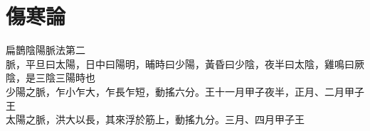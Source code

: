\documentclass[四库全书]{ltc-guji}
\begin{document}
\chapter{傷寒論}
\begin{正文}
\Space[3]扁鵲陰陽脈法第二\\
脈，平旦曰太陽，日中曰陽明，晡時曰少陽，黃昏曰少陰，夜半曰太陰，雞鳴曰厥陰，是三陰三陽時也\\
少陽之脈，乍小乍大，乍長乍短，動搖六分。王十一月甲子夜半，正月、二月甲子王\\
太陽之脈，洪大以長，其來浮於筋上，動搖九分。三月、四月甲子王\\
\end{正文}
\end{document}
